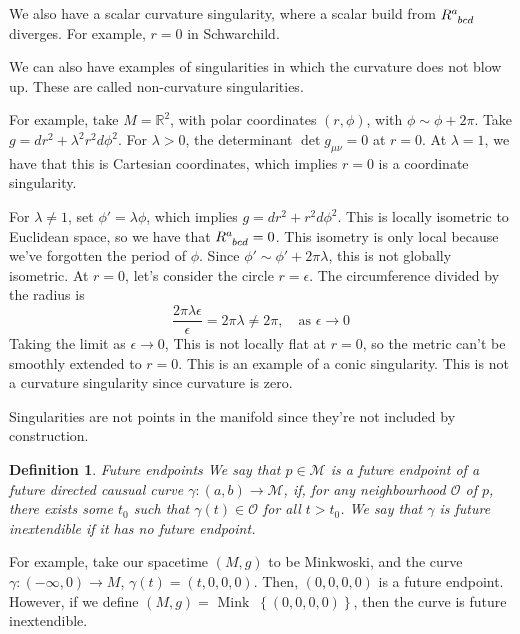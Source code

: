 \documentclass[11pt, oneside]{article}   	%
\theoremstyle{slanted}
\newtheorem*{defn}{Definition}
\begin{document}
We also have a scalar curvature 
singularity, where a scalar build from $ R \indices{ ^ a _{ bcd  } }   $ 
diverges. For example, $ r = 0$ in 
Schwarchild. 

We can also have examples of singularities 
in which the curvature does not blow up. 
These are called non-curvature singularities. 

For example, take $ M  = \mathbb{ R  }^ 2 $, 
with polar coordinates $ \left( r, \phi  \right)  $, 
with $ \phi \sim \phi + 2 \pi $. 
Take $ g  = dr ^ 2 + \lambda ^ 2 r ^ 2 d \phi ^ 2 $. 
For $ \lambda > 0 $, the determinant 
$ \det g _{ \mu \nu }  = 0 $ at $ r = 0   $. 
At $ \lambda  = 1 $, 
we have that this is Cartesian coordinates, which 
implies $ r = 0 $ is a coordinate singularity. 

For $ \lambda \neq 1 $, 
set $ \phi  ' = \lambda \phi $, which implies $ g  = dr ^ 2 
+ r ^ 2 d \phi ^ 2 $. 
This is locally isometric to Euclidean space, 
so we have that $ R \indices{ ^ a _{ bcd } }  = 0  $. 
This isometry is only local 
because we've forgotten the period of $ \phi $. 
Since $ \phi  ' \sim \phi ' + 2 \pi \lambda $, 
this is not globally isometric. 
At $ r = 0 $, 
let's consider the circle $ r  = \epsilon $. 
The circumference divided by the radius is 
\[
\frac{2 \pi \lambda \epsilon }{ \epsilon } = 2 \pi \lambda \neq 2 \pi , \quad 
\text{as  } \epsilon \to 0 
\] Taking the limit as $ \epsilon \to 0 $, 
This is not 
locally flat at $ r  = 0 $, so the metric can't be smoothly 
extended to $ r = 0$. This is 
an example of a conic singularity. 
This is not a curvature singularity since 
curvature is zero. 


Singularities are not points in the manifold 
since they're not included by construction. 

\begin{defn}{Future endpoints}
We say that $ p \in \mathcal{ M } $ is a future 
endpoint of a future directed causual curve $ \gamma : \left( a,b  \right)  
\to \mathcal{  M } $, if, for any neighbourhood
$ \mathcal{ O } $ of $ p $, there 
exists some $ t_0 $ such that $ \gamma \left(  t  \right)  
\in \mathcal{ O } $ for all $ t > t_0  $. 
We say that $ \gamma $ is future inextendible 
if it has no future endpoint.
\end{defn}

For example, take our spacetime $ \left( M , g  \right)  $ 
to be Minkwoski, and the curve 
$ \gamma : \left(   - \infty, 0   \right)  \to M $, 
$ \gamma \left( t  \right)   = \left( t, 0 , 0 , 0  \right)  $. 
Then, $ \left( 0 , 0 , 0 , 0   \right)  $ is 
a future endpoint. 
However, if we define $ \left( M , g  \right)   = \text{ Mink } 
\ \left\{  \left( 0 , 0 , 0 , 0  \right)   \right\}   $, 
then the curve is future inextendible.
\end{document}

